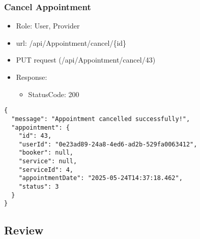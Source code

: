 \documentclass[11pt]{article}
\begin{document}
\subsubsection{Cancel Appointment}
\label{sec:org14925d3}
\begin{itemize}
\item Role: User, Provider
\item url: /api/Appointment/cancel/\{id\}
\item PUT request (/api/Appointment/cancel/43)
\item Response:
\begin{itemize}
\item StatusCode: 200
\end{itemize}
\end{itemize}
\begin{verbatim}
{
  "message": "Appointment cancelled successfully!",
  "appointment": {
    "id": 43,
    "userId": "0e23ad89-24a8-4ed6-ad2b-529fa0063412",
    "booker": null,
    "service": null,
    "serviceId": 4,
    "appointmentDate": "2025-05-24T14:37:18.462",
    "status": 3
  }
}
\end{verbatim}
\subsection{Review}
\label{sec:orgb1e8340}
\end{document}
